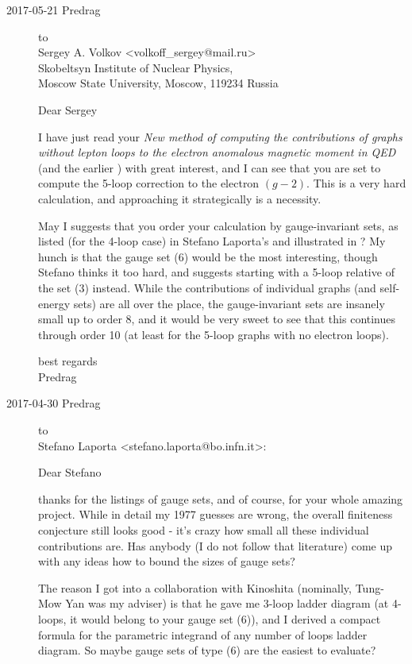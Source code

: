 
\begin{description}

\item[2017-05-21 Predrag] to
\\
Sergey  A. Volkov <volkoff\_sergey@mail.ru>
\\
Skobeltsyn Institute of Nuclear Physics,
\\
Moscow State University, Moscow, 119234 Russia

Dear Sergey

I have just read your
{\em New method of computing the contributions of graphs without lepton
loops to the electron anomalous magnetic moment in {QED}}
(and the earlier ) with great interest, and I can see
that you are set to compute the 5-loop correction to the electron
$(g-2)$. This is a very hard calculation, and approaching it
strategically is a necessity.

May I suggests that you order your calculation by gauge-invariant sets,
as listed (for the 4-loop case) in Stefano Laporta's
 and illustrated in
? My hunch is that the gauge set (6) would be
the most interesting, though Stefano thinks it too hard, and suggests
starting with a 5-loop relative of the set (3) instead. While the
contributions of individual graphs (and self-energy sets)
are all over the place, the gauge-invariant sets are insanely small up to
order 8, and it would be very sweet to see that this continues through
order 10 (at least for the 5-loop graphs with no electron loops).

best regards
\\
Predrag

\item[2017-04-30 Predrag] to \\
Stefano Laporta <stefano.laporta@bo.infn.it>:

Dear Stefano

thanks for the listings of gauge sets, and of course, for your whole amazing
project. While in detail my 1977 guesses are wrong, the overall finiteness conjecture
still looks good - it's crazy how small all these individual contributions are.
Has anybody (I do not follow that literature) come up with any ideas how to
bound the sizes of gauge sets?

The reason I got into a collaboration with Kinoshita (nominally, Tung-Mow Yan was
my adviser) is that he gave me 3-loop ladder diagram (at 4-loops, it would belong
to your gauge set (6)), and I derived a compact formula for the parametric
integrand of any number of loops ladder diagram. So maybe gauge sets of type (6)
are the easiest to evaluate?


\end{description}

